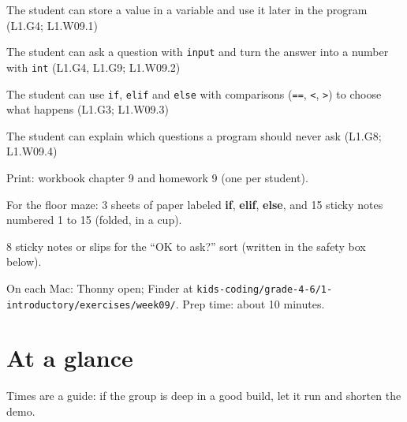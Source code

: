 
\begin{objectives}
  \item The student can store a value in a variable and use it later in the program (L1.G4; L1.W09.1)
  \item The student can ask a question with \texttt{input} and turn the answer into a number with \texttt{int} (L1.G4, L1.G9; L1.W09.2)
  \item The student can use \texttt{if}, \texttt{elif} and \texttt{else} with comparisons (\texttt{==}, \texttt{<}, \texttt{>}) to choose what happens (L1.G3; L1.W09.3)
  \item The student can explain which questions a program should never ask (L1.G8; L1.W09.4)
\end{objectives}

\begin{materials}
  \item Print: workbook chapter 9 and homework 9 (one per student).
  \item For the floor maze: 3 sheets of paper labeled \textbf{if}, \textbf{elif}, \textbf{else}, and 15 sticky notes numbered 1 to 15 (folded, in a cup).
  \item 8 sticky notes or slips for the \enquote{OK to ask?} sort (written in the safety box below).
  \item On each Mac: Thonny open; Finder at \texttt{kids-coding/grade-4-6/1-introductory/exercises/week09/}. Prep time: about 10 minutes.
\end{materials}

\section{At a glance}
Times are a guide: if the group is deep in a good build, let it run and shorten the demo.
\begin{timeplan}
\end{timeplan}

